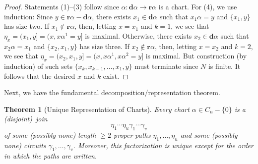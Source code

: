 \documentclass{surv-l}
\numberwithin{equation}{section}
\numberwithin{table}{section}
\numberwithin{figure}{section}
\newtheorem{theorem}[equation]{Theorem}
\theoremstyle{definition}
\begin{document}
\begin{proof} Statements (1)--(3) follow since $\alpha :
\mathbf{d}\alpha\rightarrow \mathbf{r}\alpha$ is a chart. For
(4), we use induction: Since $y\in
\mathbf{r}\alpha-\mathbf{d}\alpha$, there exists $ x_{1}\in
\mathbf{d}\alpha$ such that $x_{1}\alpha=y$ and $\{x_{1},y\}$
has size two. If $x_{1}\not\in \mathbf{r}\alpha$, then,
letting $x=x_{1}$ and $k=1$, we see that $\eta_{x}=(x_{1},
y]=(x,x\alpha^{1}=y]$ is maximal. Otherwise, there exists
$x_{2}\in \mathbf{d}\alpha$ such that $x_{2}\alpha=x_{1}$ and
$\{x_{2},x_{1},y\}$ has size three. If $ x_{2}\not\in
\mathbf{r}\alpha$, then, letting $x=x_{2}$ and $k=2$, we see
that $\eta_{x}=(x_{2}, x_{1},y]=(x,x\alpha^{1},x\alpha^{2}=y]$
is maximal. But construction (by induction) of such sets
$\{x_{k},x_{k-1},\ldots, x_{1},y\}$ must terminate since $N$
is finite. It follows that the desired $x$ and $k$ exist.
\end{proof}

Next, we have the fundamental decomposition/representation
theorem.

\begin{theorem}[Unique Representation of Charts]\label{thm1.3.2}
Every chart $\alpha\in C_{n}-\{0\}$ is a (disjoint)~join
\[
\eta_{1}\cdots\eta_{u}\gamma_{1}\cdots\gamma_{v}
\]
of some (possibly none) length $\geq 2$ proper paths
$\eta_{1},\ldots, \eta_{u}$ and some (possibly none)
circuits $\gamma_{1},\ldots, \gamma_{v}$. Moreover, this
factorization is unique except for the order in which the
paths are written.
\end{theorem}
\end{document}
